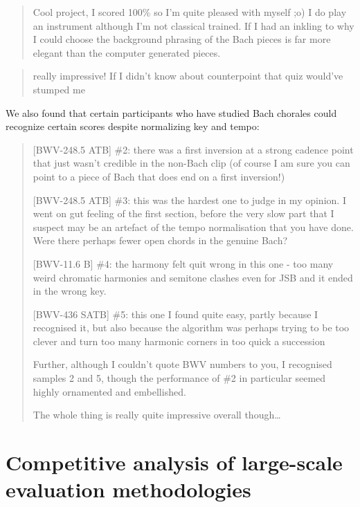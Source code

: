 \begin{quote}
  Cool project, I scored 100\% so I'm quite pleased with myself ;o) I do
  play an instrument although I'm not classical trained. If I had an
  inkling to why I could choose the background phrasing of the Bach
  pieces is far more elegant than the computer generated pieces.
\end{quote}


\begin{quote}
  really impressive! If I didn't know about counterpoint that quiz would've stumped me
\end{quote}

We also found that certain participants who have studied Bach chorales could recognize
certain scores despite normalizing key and tempo:
\begin{quote}
  [BWV-248.5 ATB]
  \#2: there was a first inversion at a strong cadence point that just wasn't
  credible in the non-Bach clip (of course I am sure you can point to a piece
  of Bach that does end on a first inversion!)

  [BWV-248.5 ATB]
  \#3: this was the hardest one to judge in my opinion. I went on gut feeling
  of the first section, before the very slow part that I suspect may be an
  artefact of the tempo normalisation that you have done. Were there perhaps
  fewer open chords in the genuine Bach?

  [BWV-11.6 B]
  \#4: the harmony felt quit wrong in this one - too many weird chromatic
  harmonies and semitone clashes even for JSB and it ended in the wrong key.

  [BWV-436 SATB]
  \#5: this one I found quite easy, partly because I recognised it, but also
  because the algorithm was perhaps trying to be too clever and turn too many
  harmonic corners in too quick a succession

  Further, although I couldn't quote BWV numbers to you, I recognised samples 2
  and 5, though the performance of \#2 in particular seemed highly ornamented
  and embellished.

  The whole thing is really quite impressive overall though\ldots
\end{quote}

\section{Competitive analysis of large-scale evaluation methodologies}



